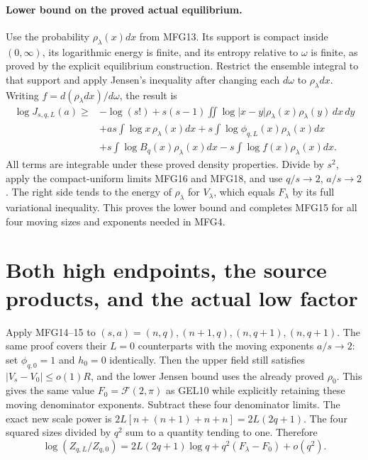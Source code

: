\paragraph{Lower bound on the proved actual equilibrium.}
Use the probability $\rho_\lambda(x)dx$ from MFG13. Its support is
compact inside $(0,\infty)$, its logarithmic energy is finite, and its
entropy relative to $\omega$ is finite, as proved by the explicit
equilibrium construction. Restrict the ensemble integral to that
support and apply Jensen's inequality after changing each $d\omega$
to $\rho_\lambda dx$. Writing $f=d(\rho_\lambda dx)/d\omega$, the
result is
\[
 \begin{aligned}
 \log J_{s,q,L}(a)\ge{}&-\log(s!)
 +s(s-1)\iint\log|x-y|\rho_\lambda(x)\rho_\lambda(y)\,dx\,dy\\
 &+as\int\log x\,\rho_\lambda(x)dx
 +s\int\log\phi_{q,L}(x)\rho_\lambda(x)dx\\
 &+s\int\log B_q(x)\rho_\lambda(x)dx
 -s\int\log f(x)\rho_\lambda(x)dx.
 \end{aligned}
\]
All terms are integrable under these proved density properties.
Divide by $s^2$, apply the compact-uniform limits MFG16 and MFG18,
and use $q/s\to2$, $a/s\to2$. The right side tends to
the energy of $\rho_\lambda$ for $V_\lambda$, which equals
$F_\lambda$ by its full variational inequality. This proves the lower
bound and completes MFG15 for all four moving sizes and exponents
needed in MFG4.

\section{Both high endpoints, the source products, and the actual low factor}

Apply MFG14--15 to $(s,a)=(n,q),(n+1,q),(n,q+1),(n,q+1)$.
The same proof covers their $L=0$ counterparts with the moving
exponents $a/s\to2$: set $\phi_{q,0}=1$ and $h_0=0$ identically.
Then the upper field still satisfies $|V_s-V_0|\le o(1)R$, and
the lower Jensen bound uses the already proved $\rho_0$. This gives
the same value $F_0=\mathcal F(2,\pi)$ as GEL10 while explicitly
retaining these moving denominator exponents. Subtract these four
denominator limits. The exact new scale power
is $2L[n+(n+1)+n+n]=2L(2q+1)$. The four squared sizes divided by
$q^2$ sum to a quantity tending to one. Therefore
\[
 \boxed{\log(Z_{q,L}/Z_{q,0})
 =2L(2q+1)\log q+q^2(F_\lambda-F_0)+o(q^2).}
 \tag{MFG19}
\]

